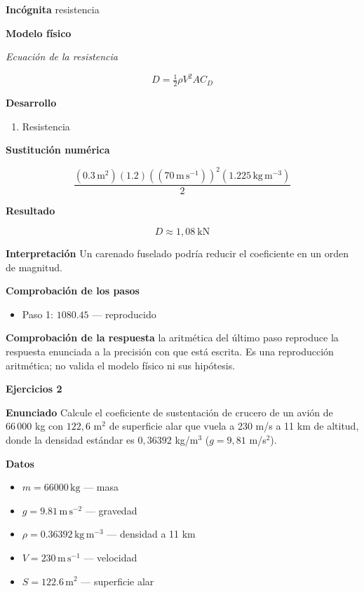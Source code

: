 \documentclass[10pt,openany]{book}
\begin{document}
\noindent\textbf{Incógnita}
resistencia

\noindent\textbf{Modelo físico}

\noindent\textit{Ecuación de la resistencia}

\[
D = \tfrac12\rho V^{2} A C_D
\]

\noindent\textbf{Desarrollo}
\begin{enumerate}
\item
Resistencia
\end{enumerate}

\noindent\textbf{Sustitución numérica}

\[
\frac{\left(0.3\,\mathrm{m}^{2}\right) \left(1.2\right) \left(\left(70\,\mathrm{m}\,\mathrm{s}^{-1}\right)\right)^{2} \left(1.225\,\mathrm{kg}\,\mathrm{m}^{-3}\right)}{2}
\]

\noindent\textbf{Resultado}

\[
D \approx 1{,}08\ \mathrm{kN}
\]

\noindent\textbf{Interpretación}
Un carenado fuselado podría reducir el coeficiente en un orden de magnitud.

\noindent\textbf{Comprobación de los pasos}
\begin{itemize}
\item Paso 1: $1080.45$ — reproducido
\end{itemize}

\noindent\textbf{Comprobación de la respuesta} la aritmética del último paso reproduce la respuesta enunciada a la precisión con que está escrita. Es una reproducción aritmética; no valida el modelo físico ni sus hipótesis.

\noindent\textbf{Ejercicios 2}

\noindent\textbf{Enunciado}
Calcule el coeficiente de sustentación de crucero de un avión de \(66\,000\) kg con \(122{,}6\) m\(^2\) de superficie alar que vuela a 230 m/s a 11 km de altitud, donde la densidad estándar es \(0{,}36392\) kg/m\(^3\) (\(g = 9{,}81\) m/s\(^2\)).

\noindent\textbf{Datos}
\begin{itemize}
\item $m = 66000\,\mathrm{kg}$ — masa
\item $g = 9.81\,\mathrm{m}\,\mathrm{s}^{-2}$ — gravedad
\item $\rho = 0.36392\,\mathrm{kg}\,\mathrm{m}^{-3}$ — densidad a 11 km
\item $V = 230\,\mathrm{m}\,\mathrm{s}^{-1}$ — velocidad
\item $S = 122.6\,\mathrm{m}^{2}$ — superficie alar
\end{itemize}
\end{document}
